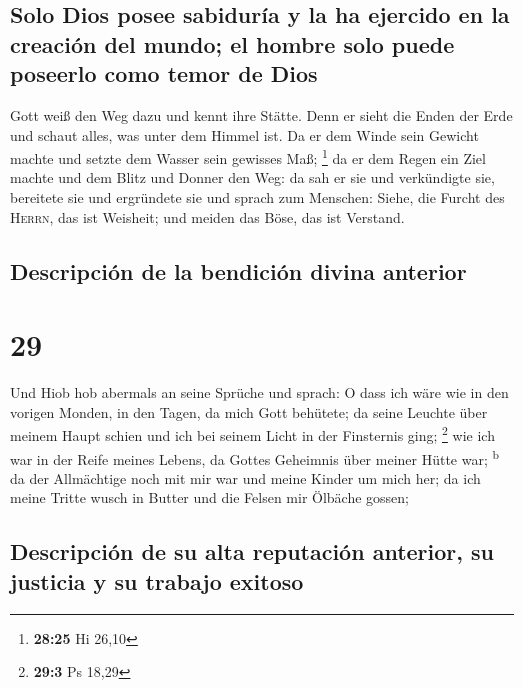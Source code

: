 \hypertarget{solo-dios-posee-sabiduruxeda-y-la-ha-ejercido-en-la-creaciuxf3n-del-mundo-el-hombre-solo-puede-poseerlo-como-temor-de-dios}{%
\subsection{Solo Dios posee sabiduría y la ha ejercido en la creación
del mundo; el hombre solo puede poseerlo como temor de
Dios}\label{solo-dios-posee-sabiduruxeda-y-la-ha-ejercido-en-la-creaciuxf3n-del-mundo-el-hombre-solo-puede-poseerlo-como-temor-de-dios}}

 Gott weiß den Weg dazu und kennt ihre Stätte.
 Denn er sieht die Enden der Erde und schaut alles, was
unter dem Himmel ist.  Da er dem Winde sein Gewicht
machte und setzte dem Wasser sein gewisses Maß; \footnote{\textbf{28:25}
  Hi 26,10}  da er dem Regen ein Ziel machte und dem
Blitz und Donner den Weg:  da sah er sie und verkündigte
sie, bereitete sie und ergründete sie  und sprach zum
Menschen: Siehe, die Furcht des \textsc{Herrn}, das ist Weisheit; und
meiden das Böse, das ist Verstand.

\hypertarget{descripciuxf3n-de-la-bendiciuxf3n-divina-anterior}{%
\subsection{Descripción de la bendición divina
anterior}\label{descripciuxf3n-de-la-bendiciuxf3n-divina-anterior}}

\hypertarget{section-28}{%
\section{29}\label{section-28}}

 Und Hiob hob abermals an seine Sprüche und sprach:
 O dass ich wäre wie in den vorigen Monden, in den Tagen,
da mich Gott behütete;  da seine Leuchte über meinem Haupt
schien und ich bei seinem Licht in der Finsternis ging; \footnote{\textbf{29:3}
  Ps 18,29}  wie ich war in der Reife meines Lebens, da
Gottes Geheimnis über meiner Hütte war; \textsuperscript{b}
 da der Allmächtige noch mit mir war und meine Kinder um
mich her;  da ich meine Tritte wusch in Butter und die
Felsen mir Ölbäche gossen;

\hypertarget{descripciuxf3n-de-su-alta-reputaciuxf3n-anterior-su-justicia-y-su-trabajo-exitoso}{%
\subsection{Descripción de su alta reputación anterior, su justicia y su
trabajo
exitoso}\label{descripciuxf3n-de-su-alta-reputaciuxf3n-anterior-su-justicia-y-su-trabajo-exitoso}}

